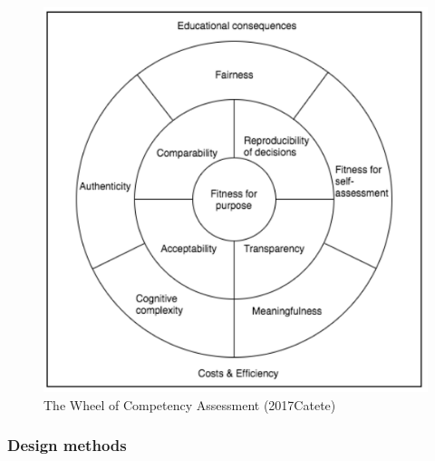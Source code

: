 \begin{figure}\label{fig:AdaptedQualityCriteriaCatete}
\includegraphics[scale=0.6]{figures/AdaptedQualityCriteriaCatete.png}
\caption{The Wheel of Competency Assessment (2017Catete)}
\end{figure}



\subsubsection*{Design methods}





